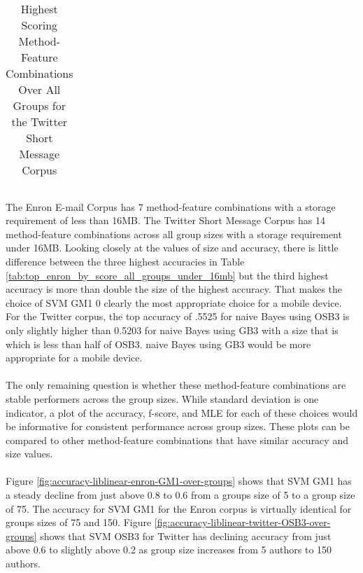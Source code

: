 \begin{table}[htbp!]
\begin{center}
\begin{tabular}{ | r | r | r | r | r | r | r | r| r | }
\end{tabular}
		\caption{Highest Scoring Method-Feature Combinations Over All Groups for the Twitter Short Message Corpus}
		\label{tab:top_twitter_by_score_all_groups_under_16mb}
	\end{center}
\end{table}

\paragraph*{} The Enron E-mail Corpus has 7 method-feature combinations with a storage requirement of less than 16MB. The Twitter Short Message Corpus has 14 method-feature combinations across all group sizes with a storage requirement under 16MB.  Looking closely at the values of size and accuracy, there is little difference between the three highest accuracies in Table \ref{tab:top_enron_by_score_all_groups_under_16mb} but the third highest accuracy is more than double the size of the highest accuracy.  That makes the choice of SVM GM1 0 clearly the most appropriate choice for a mobile device. For the Twitter corpus, the top accuracy of .5525 for naive Bayes using OSB3 is only slightly higher than 0.5203 for naive Bayes using GB3 with a size that is which is less than half of OSB3.  naive Bayes using GB3 would be more appropriate for a mobile device.

\paragraph*{} The only remaining question is whether these method-feature combinations are stable performers across the group sizes.  While standard deviation is one indicator, a plot of the accuracy, f-score, and MLE for each of these choices would be informative for consistent performance across group sizes.  These plots can be compared to other method-feature combinations that have similar accuracy and size values.

\paragraph*{} Figure \ref{fig:accuracy-liblinear-enron-GM1-over-groups} shows that SVM GM1 has a steady decline from just above 0.8 to 0.6 from a groups size of 5 to a group size of 75.  The accuracy for SVM GM1 for the Enron corpus is virtually identical for groups sizes of 75 and 150. Figure \ref{fig:accuracy-liblinear-twitter-OSB3-over-groups} shows that SVM OSB3 for Twitter has declining accuracy from just above 0.6 to slightly above 0.2 as group size increases from 5 authors to 150 authors.  

